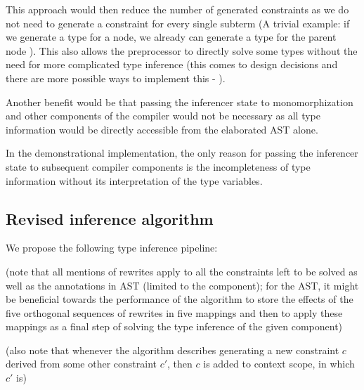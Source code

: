 This approach would then reduce the number of generated constraints as we do not need to generate a constraint for every single subterm (A trivial example: if we generate a type  for a  node, we already can generate a type  for the parent node ). This also allows the preprocessor to directly solve some types without the need for more complicated type inference (this comes to design decisions and there are more possible ways to implement this - ).

Another benefit would be that passing the inferencer state to monomorphization and other components of the compiler would not be necessary as all type information would be directly accessible from the elaborated AST alone.

\begin{remark}
    In the demonstrational implementation, the only reason for passing the inferencer state to subsequent compiler components is the incompleteness of type information without its interpretation of the type variables. 
\end{remark}

\subsection{Revised inference algorithm}

We propose the following type inference pipeline:

(note that all mentions of rewrites apply to all the constraints left to be solved as well as the annotations in AST (limited to the component); for the AST, it might be beneficial towards the performance of the algorithm to store the effects of the five orthogonal sequences of rewrites in five mappings and then to apply these mappings as a final step of solving the type inference of the given component)

(also note that whenever the algorithm describes generating a new constraint $c$ derived from some other constraint $c'$, then $c$ is added to context scope, in which $c'$ is)

